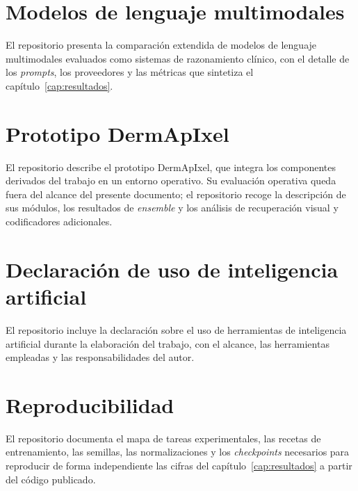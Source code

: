 \section{Modelos de lenguaje multimodales}
\label{sec:repo-llm}

El repositorio presenta la comparación extendida de modelos de
lenguaje multimodales evaluados como sistemas de razonamiento
clínico, con el detalle de los \emph{prompts}, los proveedores y las
métricas que sintetiza el capítulo~\ref{cap:resultados}.

\section{Prototipo DermApIxel}
\label{sec:repo-prototipo}

El repositorio describe el prototipo DermApIxel, que integra los
componentes derivados del trabajo en un entorno operativo. Su
evaluación operativa queda fuera del alcance del presente documento;
el repositorio recoge la descripción de sus módulos, los resultados
de \emph{ensemble} y los análisis de recuperación visual y
codificadores adicionales.

\section{Declaración de uso de inteligencia artificial}
\label{sec:repo-ia}

El repositorio incluye la declaración sobre el uso de herramientas
de inteligencia artificial durante la elaboración del trabajo, con
el alcance, las herramientas empleadas y las responsabilidades del
autor.

\section{Reproducibilidad}
\label{sec:repo-reproducibilidad}

El repositorio documenta el mapa de tareas experimentales, las
recetas de entrenamiento, las semillas, las normalizaciones y los
\emph{checkpoints} necesarios para reproducir de forma independiente
las cifras del capítulo~\ref{cap:resultados} a partir del código
publicado.

